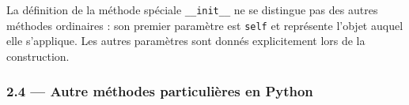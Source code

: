 \documentclass[a4paper,17pt]{extarticle}
\begin{document}
La définition de la méthode spéciale \texttt{\_\_init\_\_} ne se
distingue pas des autres méthodes ordinaires : son premier paramètre est
\texttt{self} et représente l'objet auquel elle s'applique. Les autres
paramètres sont donnés explicitement lors de la construction.

    \hypertarget{autre-muxe9thodes-particuliuxe8res-en-python}{%
\subsubsection{2.4 --- Autre méthodes particulières en
Python}\label{autre-muxe9thodes-particuliuxe8res-en-python}}

    


    
    
    
\end{document}
